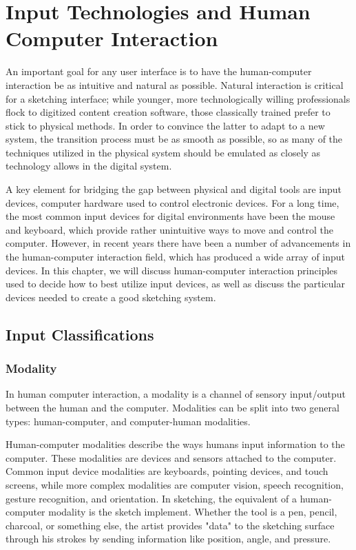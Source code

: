 \chapter{Input Technologies and Human Computer Interaction}
\label{ch:input}

An important goal for any user interface is to have the human-computer interaction be as intuitive and natural as possible.
Natural interaction is critical for a sketching interface; while younger, more technologically willing professionals flock to digitized content creation software, those classically trained prefer to stick to physical methods.
In order to convince the latter to adapt to a new system, the transition process must be as smooth as possible, so as many of the techniques utilized in the physical system should be emulated as closely as technology allows in the digital system.

A key element for bridging the gap between physical and digital tools are input devices, computer hardware used to control electronic devices.
For a long time, the most common input devices for digital environments have been the mouse and keyboard, which provide rather unintuitive ways to move and control the computer.
However, in recent years there have been a number of advancements in the human-computer interaction field, which has produced a wide array of input devices.
In this chapter, we will discuss human-computer interaction principles used to decide how to best utilize input devices, as well as discuss the particular devices needed to create a good sketching system.



\section{Input Classifications}

\subsection{Modality}

In human computer interaction, a modality is a channel of sensory input/output between the human and the computer. Modalities can be split into two general types: human-computer, and computer-human modalities.

Human-computer modalities describe the ways humans input information to the computer.
These modalities are devices and sensors attached to the computer.
Common input device modalities are keyboards, pointing devices, and touch screens, while more complex modalities are computer vision, speech recognition, gesture recognition, and orientation.
In sketching, the equivalent of a human-computer modality is the sketch implement. 
Whether the tool is a pen, pencil, charcoal, or something else, the artist provides "data" to the sketching surface through his strokes by sending information like position, angle, and pressure.

